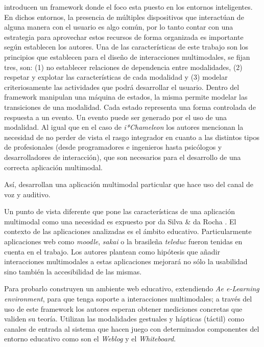 \citet{gabbanini2012innovative} introducen un framework donde el foco esta puesto en los entornos inteligentes. En dichos entornos, la presencia de múltiples dispositivos que interactúan de alguna manera con el usuario es algo común, por lo tanto contar con una estrategia para aprovechar estos recursos de forma organizada es importante según establecen los autores. Una de las características de este trabajo son los principios que establecen para el diseño de interacciones multimodales,  se fijan tres, son: 
(1) no establecer relaciones de dependencia entre modalidades, (2) respetar y explotar las características de cada modalidad y (3) modelar criteriosamente las actividades que podrá desarrollar el usuario. Dentro del framework manipulan una máquina de estados, la misma permite modelar las transiciones de una modalidad. Cada estado representa una forma controlada de respuesta a un evento. Un evento puede ser generado por el uso de una modalidad. Al igual que en el caso de \emph{i*Chameleon} los autores mencionan la necesidad de no perder de vista el rasgo integrador en cuanto a las distintos tipos de profesionales (desde programadores e ingenieros hasta psicólogos y desarrolladores de interacción), que son necesarios para el desarrollo de una correcta aplicación multimodal.

Así, \citet{gabbanini2012innovative} desarrollan una aplicación multimodal particular que hace uso del canal de voz y auditivo.


Un punto de vista diferente que pone las características de una aplicación multimodal como una necesidad es expuesto por da Silva \& da Rocha \citep{da2013learning}. El contexto de las aplicaciones analizadas es el ámbito educativo. Particularmente aplicaciones web como \emph{moodle}, \emph{sakai} o la brasileña \emph{teleduc} fueron tenidas en cuenta en el trabajo. Los autores plantean como hipótesis que añadir interacciones multimodales a estas aplicaciones mejorará no sólo la usabilidad sino también la accesibilidad de las mismas. 

Para probarlo construyen un ambiente web educativo, extendiendo \emph{Ae e-Learning environment}, para que tenga soporte a interacciones multimodales; a través del uso de este framework los autores esperan obtener mediciones concretas que validen su teoría. 
Utilizan las modalidades gestuales y hápticas (táctil) como canales de entrada al sistema que hacen juego con determinados componentes del entorno educativo como son el \emph{Weblog} y el \emph{Whiteboard}.

